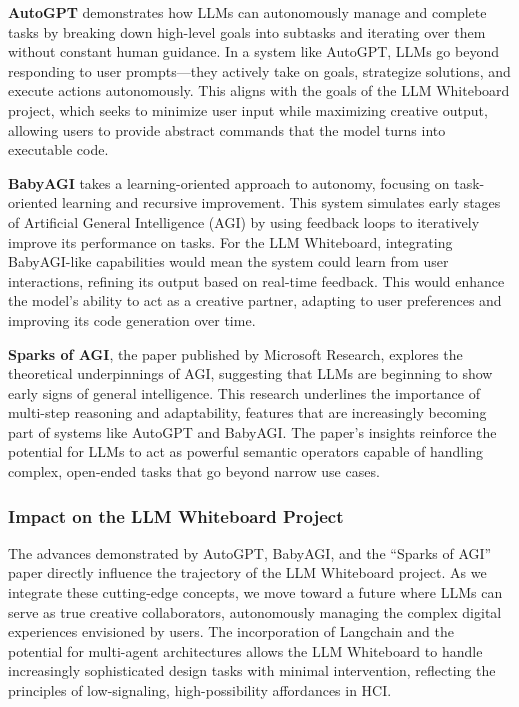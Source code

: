 \textbf{AutoGPT} demonstrates how LLMs can autonomously manage and complete tasks by breaking down high-level goals into subtasks and iterating over them without constant human guidance.
In a system like AutoGPT, LLMs go beyond responding to user prompts—they actively take on goals, strategize solutions, and execute actions autonomously.
This aligns with the goals of the LLM Whiteboard project, which seeks to minimize user input while maximizing creative output, allowing users to provide abstract commands that the model turns into executable code.

\textbf{BabyAGI} takes a learning-oriented approach to autonomy, focusing on task-oriented learning and recursive improvement.
This system simulates early stages of Artificial General Intelligence (AGI) by using feedback loops to iteratively improve its performance on tasks.
For the LLM Whiteboard, integrating BabyAGI-like capabilities would mean the system could learn from user interactions, refining its output based on real-time feedback.
This would enhance the model's ability to act as a creative partner, adapting to user preferences and improving its code generation over time.

\textbf{Sparks of AGI}, the paper published by Microsoft Research, explores the theoretical underpinnings of AGI, suggesting that LLMs are beginning to show early signs of general intelligence.
This research underlines the importance of multi-step reasoning and adaptability, features that are increasingly becoming part of systems like AutoGPT and BabyAGI.
The paper's insights reinforce the potential for LLMs to act as powerful semantic operators capable of handling complex, open-ended tasks that go beyond narrow use cases.

\subsubsection{Impact on the LLM Whiteboard Project}
The advances demonstrated by AutoGPT, BabyAGI, and the “Sparks of AGI” paper directly influence the trajectory of the LLM Whiteboard project.
As we integrate these cutting-edge concepts, we move toward a future where LLMs can serve as true creative collaborators, autonomously managing the complex digital experiences envisioned by users.
The incorporation of Langchain and the potential for multi-agent architectures allows the LLM Whiteboard to handle increasingly sophisticated design tasks with minimal intervention, reflecting the principles of low-signaling, high-possibility affordances in HCI.

